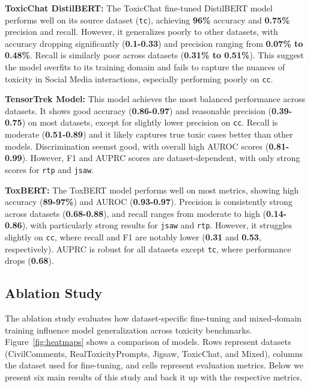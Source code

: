 \textbf{ToxicChat DistilBERT:}
The ToxicChat fine-tuned DistilBERT model performs well on its source dataset (\texttt{tc}), achieving \textbf{96\%} accuracy and \textbf{0.75\%} precision and recall. However, it generalizes poorly to other datasets, with accuracy dropping significantly (\textbf{0.1-0.33}) and precision ranging from \textbf{0.07\% to 0.48\%}. Recall is similarly poor across datasets (\textbf{0.31\% to 0.51\%}). This suggest the model overfits to its training domain and fails to capture the nuances of toxicity in Social Media interactions, especially performing poorly on \texttt{cc}.

\textbf{TensorTrek Model:}
This model achieves the most balanced performance across datasets. It shows good accuracy (\textbf{0.86-0.97}) and reasonable precision (\textbf{0.39-0.75}) on most datasets, except for slightly lower precision on \texttt{cc}. Recall is moderate (\textbf{0.51-0.89}) and it likely captures true toxic cases better than other models. Discrimination seemst good, with overall high AUROC scores (\textbf{0.81-0.99}). However, F1 and AUPRC scores are dataset-dependent, with only strong scores for \texttt{rtp} and \texttt{jsaw}.

\textbf{ToxBERT:}
The ToxBERT model performs well on most metrics, showing high accuracy (\textbf{89-97\%}) and AUROC (\textbf{0.93-0.97}). Precision is consistently strong across datasets (\textbf{0.68-0.88}), and recall ranges from moderate to high (\textbf{0.14-0.86}), with particularly strong results for \texttt{jsaw} and \texttt{rtp}. However, it struggles slightly on \texttt{cc}, where recall and F1 are notably lower (\textbf{0.31} and \textbf{0.53}, respectively). AUPRC is robust for all datasets except \texttt{tc}, where performance drops (\textbf{0.68}).\newline


\subsection{Ablation Study}
\label{sec:ablation}
The ablation study evaluates how dataset-specific fine-tuning and mixed-domain training influence model generalization across toxicity benchmarks. Figure~\ref{fig:heatmaps} shows a comparison of models. Rows represent datasets (CivilComments, RealToxicityPrompts, Jigsaw, ToxicChat, and Mixed), columns the dataset used for fine-tuning, and cells represent evaluation metrics. Below we present six main results of this study and back it up with the respective metrics. 

